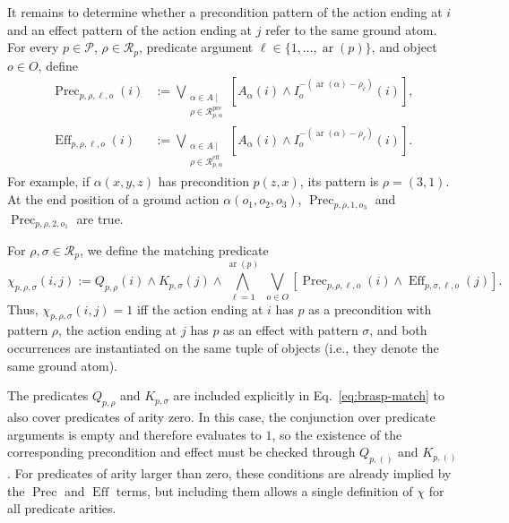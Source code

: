 It remains to determine whether a precondition pattern of the action ending
at $i$ and an effect pattern of the action ending at $j$ refer to the same
ground atom. For every $p\in\mathcal{P}$,
$\rho\in\mathcal{R}_p$, predicate argument
$\ell \in \{1,\ldots,\operatorname{ar}(p)\}$, and object $o\in O$, define
\begin{equation}
\begin{aligned}
\operatorname{Prec}_{p,\rho,\ell,o}(i)
&:=
\bigvee_{\substack{
\alpha\in A\mid\\
\rho\in\mathcal{R}^{\mathrm{pre}}_{p,\alpha}
}}
\left[
A_\alpha(i)
\land
I_o^{-(\operatorname{ar}(\alpha)-\rho_\ell)}(i)
\right],
\\
\operatorname{Eff}_{p,\rho,\ell,o}(i)
&:=
\bigvee_{\substack{
\alpha\in A\mid\\
\rho\in\mathcal{R}^{\mathrm{eff}}_{p,\alpha}
}}
\left[
A_\alpha(i)
\land
I_o^{-(\operatorname{ar}(\alpha)-\rho_\ell)}(i)
\right].
\end{aligned}
\label{eq:brasp-prec-eff}
\end{equation}
For example, if $\alpha(x,y,z)$ has precondition $p(z,x)$, its pattern is
$\rho=(3,1)$. At the end position of a ground action
$\alpha(o_1,o_2,o_3)$,
$\operatorname{Prec}_{p,\rho,1,o_3}$ and
$\operatorname{Prec}_{p,\rho,2,o_1}$ are true.

For $\rho,\sigma\in\mathcal{R}_p$, we define the matching predicate
\begin{equation}
\chi_{p,\rho,\sigma}(i,j)
:={}
Q_{p,\rho}(i)
\land
K_{p,\sigma}(j)
\land
\bigwedge_{\ell=1}^{\operatorname{ar}(p)}
\;
\bigvee_{o\in O}
\left[
\operatorname{Prec}_{p,\rho,\ell,o}(i)
\land
\operatorname{Eff}_{p,\sigma,\ell,o}(j)
\right].
\label{eq:brasp-match}
\end{equation}
Thus, $\chi_{p,\rho,\sigma}(i,j)=1$ iff the action ending at $i$ has
$p$ as a precondition with pattern $\rho$, the action ending at $j$ has
$p$ as an effect with pattern $\sigma$, and both occurrences are instantiated
on the same tuple of objects (i.e., they denote the same ground atom). 

The predicates $Q_{p,\rho}$ and $K_{p,\sigma}$ are included explicitly in
Eq.~\ref{eq:brasp-match} to also cover predicates of arity zero. In this case,
the conjunction over predicate arguments is empty and therefore evaluates to
$1$, so the existence of the corresponding precondition and effect must be
checked through $Q_{p,()}$ and $K_{p,()}$. For predicates of arity larger than zero,
these conditions are already implied by the
$\operatorname{Prec}$ and $\operatorname{Eff}$ terms, but including them
allows a single definition of $\chi$ for all predicate arities.

